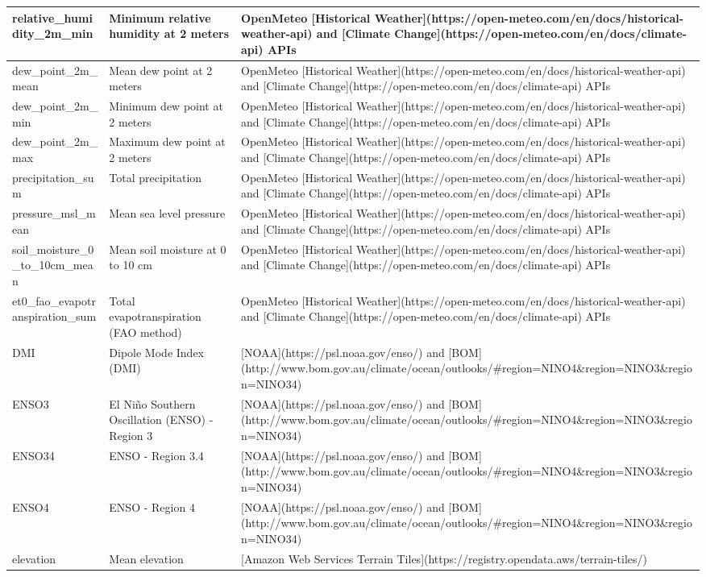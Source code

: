 \documentclass[
]{book}
\begin{document}
\begin{table}
\begin{tabular}[t]{l|l|l}
\hline
relative\_humidity\_2m\_min & Minimum relative humidity at 2 meters & OpenMeteo [Historical Weather](https://open-meteo.com/en/docs/historical-weather-api) and [Climate Change](https://open-meteo.com/en/docs/climate-api) APIs\\
\hline
dew\_point\_2m\_mean & Mean dew point at 2 meters & OpenMeteo [Historical Weather](https://open-meteo.com/en/docs/historical-weather-api) and [Climate Change](https://open-meteo.com/en/docs/climate-api) APIs\\
\hline
dew\_point\_2m\_min & Minimum dew point at 2 meters & OpenMeteo [Historical Weather](https://open-meteo.com/en/docs/historical-weather-api) and [Climate Change](https://open-meteo.com/en/docs/climate-api) APIs\\
\hline
dew\_point\_2m\_max & Maximum dew point at 2 meters & OpenMeteo [Historical Weather](https://open-meteo.com/en/docs/historical-weather-api) and [Climate Change](https://open-meteo.com/en/docs/climate-api) APIs\\
\hline
precipitation\_sum & Total precipitation & OpenMeteo [Historical Weather](https://open-meteo.com/en/docs/historical-weather-api) and [Climate Change](https://open-meteo.com/en/docs/climate-api) APIs\\
\hline
pressure\_msl\_mean & Mean sea level pressure & OpenMeteo [Historical Weather](https://open-meteo.com/en/docs/historical-weather-api) and [Climate Change](https://open-meteo.com/en/docs/climate-api) APIs\\
\hline
soil\_moisture\_0\_to\_10cm\_mean & Mean soil moisture at 0 to 10 cm & OpenMeteo [Historical Weather](https://open-meteo.com/en/docs/historical-weather-api) and [Climate Change](https://open-meteo.com/en/docs/climate-api) APIs\\
\hline
et0\_fao\_evapotranspiration\_sum & Total evapotranspiration (FAO method) & OpenMeteo [Historical Weather](https://open-meteo.com/en/docs/historical-weather-api) and [Climate Change](https://open-meteo.com/en/docs/climate-api) APIs\\
\hline
DMI & Dipole Mode Index (DMI) & [NOAA](https://psl.noaa.gov/enso/) and [BOM](http://www.bom.gov.au/climate/ocean/outlooks/\#region=NINO4\&region=NINO3\&region=NINO34)\\
\hline
ENSO3 & El Niño Southern Oscillation (ENSO) - Region 3 & [NOAA](https://psl.noaa.gov/enso/) and [BOM](http://www.bom.gov.au/climate/ocean/outlooks/\#region=NINO4\&region=NINO3\&region=NINO34)\\
\hline
ENSO34 & ENSO - Region 3.4 & [NOAA](https://psl.noaa.gov/enso/) and [BOM](http://www.bom.gov.au/climate/ocean/outlooks/\#region=NINO4\&region=NINO3\&region=NINO34)\\
\hline
ENSO4 & ENSO - Region 4 & [NOAA](https://psl.noaa.gov/enso/) and [BOM](http://www.bom.gov.au/climate/ocean/outlooks/\#region=NINO4\&region=NINO3\&region=NINO34)\\
\hline
elevation & Mean elevation & [Amazon Web Services Terrain Tiles](https://registry.opendata.aws/terrain-tiles/)\\
\hline
\end{tabular}
\end{table}
\end{document}
